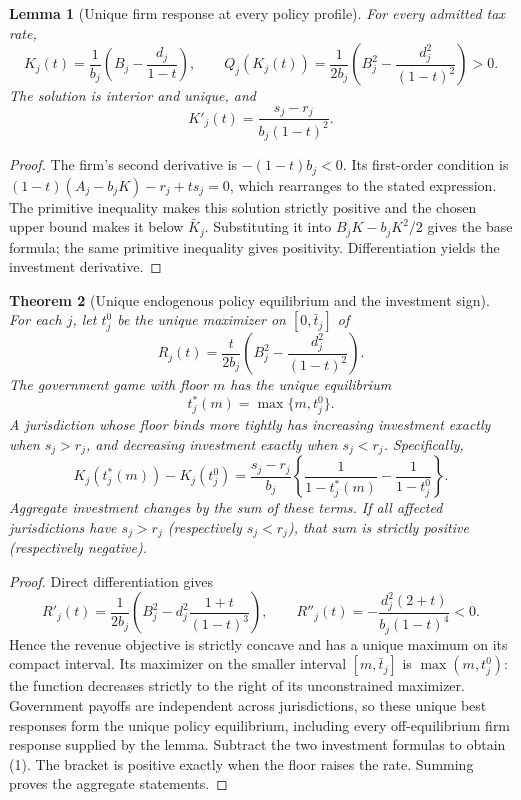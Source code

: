\documentclass[11pt,a4paper]{article}
\newtheorem{theorem}{Theorem}
\newtheorem{lemma}[theorem]{Lemma}
\begin{document}
\begin{lemma}[Unique firm response at every policy profile]
For every admitted tax rate,
\[
 K_j(t)=\frac1{b_j}\left(B_j-\frac{d_j}{1-t}\right),\qquad
 Q_j(K_j(t))=\frac1{2b_j}\left(B_j^2-\frac{d_j^2}{(1-t)^2}\right)>0.
\]
The solution is interior and unique, and
\[
 K'_j(t)=\frac{s_j-r_j}{b_j(1-t)^2}.
\]
\end{lemma}
\begin{proof}
The firm's second derivative is $-(1-t)b_j<0$. Its first-order condition is
$(1-t)(A_j-b_jK)-r_j+ts_j=0$, which rearranges to the stated expression. The primitive inequality makes this solution strictly positive and the chosen upper bound makes it below $\bar K_j$. Substituting it into $B_jK-b_jK^2/2$ gives the base formula; the same primitive inequality gives positivity. Differentiation yields the investment derivative.
\end{proof}

\begin{theorem}[Unique endogenous policy equilibrium and the investment sign]
For each $j$, let $t_j^0$ be the unique maximizer on $[0,\bar t_j]$ of
\[
 R_j(t)=\frac{t}{2b_j}\left(B_j^2-\frac{d_j^2}{(1-t)^2}\right).
\]
The government game with floor $m$ has the unique equilibrium
\[
 t_j^*(m)=\max\{m,t_j^0\}.
\]
A jurisdiction whose floor binds more tightly has increasing investment exactly when $s_j>r_j$, and decreasing investment exactly when $s_j<r_j$. Specifically,
\[
 K_j(t_j^*(m))-K_j(t_j^0)
 =\frac{s_j-r_j}{b_j}
       \left\{\frac1{1-t_j^*(m)}-\frac1{1-t_j^0}\right\}.\tag{1}
\]
Aggregate investment changes by the sum of these terms. If all affected jurisdictions have $s_j>r_j$ (respectively $s_j<r_j$), that sum is strictly positive (respectively negative).
\end{theorem}
\begin{proof}
Direct differentiation gives
\[
 R'_j(t)=\frac1{2b_j}\left(B_j^2-d_j^2\frac{1+t}{(1-t)^3}\right),
 \qquad
 R''_j(t)=-\frac{d_j^2(2+t)}{b_j(1-t)^4}<0.
\]
Hence the revenue objective is strictly concave and has a unique maximum on its compact interval. Its maximizer on the smaller interval $[m,\bar t_j]$ is $\max(m,t_j^0)$: the function decreases strictly to the right of its unconstrained maximizer. Government payoffs are independent across jurisdictions, so these unique best responses form the unique policy equilibrium, including every off-equilibrium firm response supplied by the lemma. Subtract the two investment formulas to obtain (1). The bracket is positive exactly when the floor raises the rate. Summing proves the aggregate statements.
\end{proof}
\end{document}
